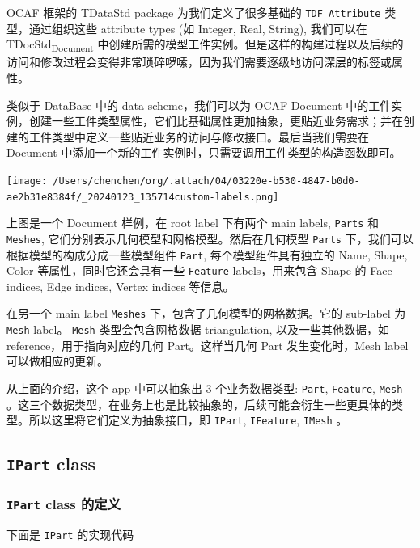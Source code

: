 \documentclass[11pt]{article}
\begin{document}
OCAF 框架的 TDataStd package 为我们定义了很多基础的 \texttt{TDF\_Attribute} 类型，通过组织这些 attribute types (如 Integer, Real, String), 我们可以在 TDocStd\textsubscript{Document} 中创建所需的模型工件实例。但是这样的构建过程以及后续的访问和修改过程会变得非常琐碎啰嗦，因为我们需要逐级地访问深层的标签或属性。

类似于 DataBase 中的 data scheme，我们可以为 OCAF Document 中的工件实例，创建一些工件类型属性，它们比基础属性更加抽象，更贴近业务需求；并在创建的工件类型中定义一些贴近业务的访问与修改接口。最后当我们需要在 Document 中添加一个新的工件实例时，只需要调用工件类型的构造函数即可。

\begin{center}
\texttt{[image: /Users/chenchen/org/.attach/04/03220e-b530-4847-b0d0-ae2b31e8384f/\_20240123\_135714custom-labels.png]}
\end{center}

上图是一个 Document 样例，在 root label 下有两个 main labels, \texttt{Parts} 和 \texttt{Meshes}, 它们分别表示几何模型和网格模型。然后在几何模型 \texttt{Parts} 下，我们可以根据模型的构成分成一些模型组件 \texttt{Part}, 每个模型组件具有独立的 Name, Shape, Color 等属性，同时它还会具有一些 \texttt{Feature} labels，用来包含 Shape 的 Face indices, Edge indices, Vertex indices 等信息。

在另一个 main label \texttt{Meshes} 下，包含了几何模型的网格数据。它的 sub-label 为 \texttt{Mesh} label。 \texttt{Mesh} 类型会包含网格数据 triangulation, 以及一些其他数据，如 reference，用于指向对应的几何 Part。这样当几何 Part 发生变化时，Mesh label 可以做相应的更新。

从上面的介绍，这个 app 中可以抽象出 3 个业务数据类型: \texttt{Part}, \texttt{Feature}, \texttt{Mesh} 。这三个数据类型，在业务上也是比较抽象的，后续可能会衍生一些更具体的类型。所以这里将它们定义为抽象接口，即 \texttt{IPart}, \texttt{IFeature}, \texttt{IMesh} 。
\subsection{\texttt{IPart} class}
\label{sec:org331ace5}

\subsubsection{\texttt{IPart} class 的定义}
\label{sec:org1676d55}

下面是 \texttt{IPart} 的实现代码
\end{document}
